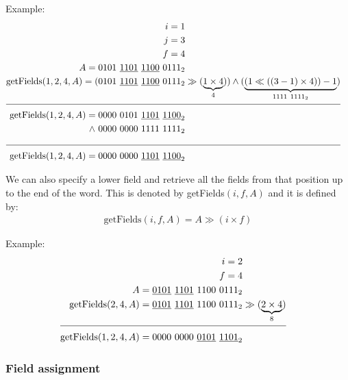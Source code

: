 Example:
\begin{align*}
    i = 1\\
    j = 3\\
    f = 4\\
    A = 0101\ \underline{1101}\ \underline{1100}\ 0111_2& \\
    \text{getFields}(1, 2, 4, A) = (0101\ \underline{1101}\ \underline{1100}\ 0111_2& \gg (\underbrace{1 \times 4}_{4})) \wedge (\underbrace{(1 \ll ((3 - 1) \times 4)) - 1}_{1111\ 1111_2})\\
    \cline{1-2}
    \text{getFields}(1, 2, 4, A) = 0000\ 0101\ \underline{1101}\ \underline{1100}_2&\\
    \wedge\ 0000\ 0000\ 1111\ 1111_2 \\
    \cline{1-2}
    \text{getFields}(1, 2, 4, A) = 0000\ 0000\ \underline{1101}\ \underline{1100}_2&
\end{align*}

We can also specify a lower field and retrieve all the fields from that position up to the end of the word. This is denoted by getFields$(i, f, A)$ and it is defined by:
\begin{align*}
    \text{getFields}(i, f, A) = A \gg (i \times f)
\end{align*}

Example:
\begin{align*}
    i = 2\\
    f = 4\\
    A = \underline{0101}\ \underline{1101}\ 1100\ 0111_2& \\
    \text{getFields}(2, 4, A) = \underline{0101}\ \underline{1101}\ 1100\ 0111_2& \gg (\underbrace{2 \times 4}_{8})\\
    \cline{1-2}
    \text{getFields}(1, 2, 4, A) = 0000\ 0000\ \underline{0101}\ \underline{1101}_2&
\end{align*}

\subsubsection{Field assignment}

